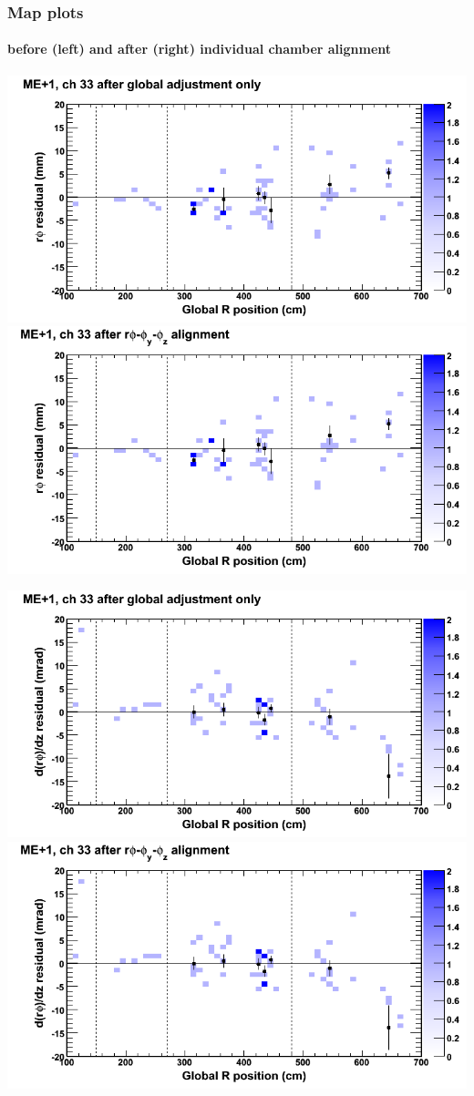 \documentclass[compress]{beamer}
\begin{document}
\begin{frame}
\frametitle{Map plots}
\framesubtitle{before (left) and after (right) individual chamber alignment}
\includegraphics[width=0.5\linewidth]{ringmapplots_3dof/before_CSCvsr_mep1ch33_x.png} \includegraphics[width=0.5\linewidth]{ringmapplots_3dof/after_CSCvsr_mep1ch33_x.png}

\includegraphics[width=0.5\linewidth]{ringmapplots_3dof/before_CSCvsr_mep1ch33_dxdz.png} \includegraphics[width=0.5\linewidth]{ringmapplots_3dof/after_CSCvsr_mep1ch33_dxdz.png}
\end{frame}
\end{document}
